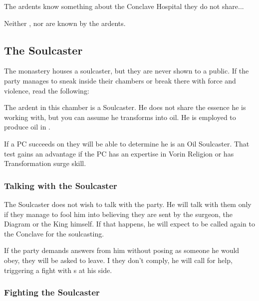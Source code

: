 The ardents know something about the Conclave Hospital they do not share...

Neither \npcOrphanSick{}, nor \npcGhostbloodWounded{} are known by the ardents.





\subsection{The Soulcaster}
\label{ssec:vorinMonasterySoulcaster}

The monastery houses a soulcaster, but they are never shown to a public. If the party manages to sneak inside their chambers or break there with force and violence, read the following:


The ardent in this chamber is a Soulcaster. He does not share the essence he is working with, but you can assume he transforms into oil. He is employed to produce oil in .

If a PC succeeds on  they will be able to determine he is an Oil Soulcaster. That test gains an advantage if the PC has an expertise in Vorin Religion or has Transformation surge skill.

\subsubsection{Talking with the Soulcaster}

The Soulcaster does not wish to talk with the party. He will talk with them only if they manage to fool him into believing they are sent by the surgeon, the Diagram or the King himself. If that happens, he will expect to be called again to the Conclave for the soulcasting.

If the party demands answers from him without posing as someone he would obey, they will be asked to leave. I they don't comply, he will call for help, triggering a fight with \enemyDiagramMuscle{}s at his side.

\subsubsection{Fighting the Soulcaster}

